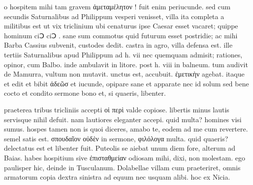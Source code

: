 


 o hospitem mihi tam gravem ἀμεταμέλητον ! fuit enim periucunde. sed cum secundis Saturnalibus ad Philippum vesperi venisset, villa ita completa a militibus est ut vix triclinium ubi cenaturus ipse Caesar esset vacaret; quippe hominum ciↃ ciↃ . sane sum commotus quid futurum esset postridie; ac mihi Barba Cassius subvenit, custodes dedit. castra in agro, villa defensa est. ille tertiis Saturnalibus apud Philippum ad h. vii nec quemquam admisit; rationes, opinor, cum Balbo. inde ambulavit in litore. post h. viii in balneum. tum audivit de Mamurra, vultum non mutavit. unctus est, accubuit. ἐμετικὴν agebat. itaque et edit et bibit ἀδεῶσ et iucunde, opipare sane et apparate nec id solum sed bene cocto et condito sermone bono et, si quaeris, libenter.

 praeterea tribus tricliniis accepti οἱ περὶ valde copiose. libertis minus lautis servisque nihil defuit. nam lautiores eleganter accepi. quid multa? homines visi sumus. hospes tamen non is quoi diceres, amabo te, eodem ad me cum revertere. semel satis est. σπουδαῖον οὐδὲν in sermone, φιλόλογα multa. quid quaeris? delectatus est et libenter fuit. Puteolis se aiebat unum diem fore, alterum ad Baias. habes hospitium sive ἐπισταθμείαν odiosam mihi, dixi, non molestam. ego paulisper hic, deinde in Tusculanum. Dolabellae villam cum praeteriret, omnis armatorum copia dextra sinistra ad equum nec usquam alibi. hoc ex Nicia.
